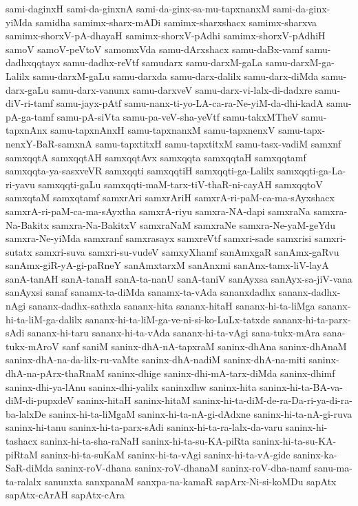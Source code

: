 {sami-daginxH
sami-da-ginxnA
sami-da-ginx-sa-mu-tapxnanxM
sami-da-ginx-yiMda
samidha
samimx-sharx-mADi
samimx-sharxshacx
samimx-sharxva
samimx-shorxV-pA-dhayaH
samimx-shorxV-pAdhi
samimx-shorxV-pAdhiH
samoV
samoV-peVtoV
samomxVda
samu-dArxshacx
samu-daBx-vamf
samu-dadhxqqtayx
samu-dadhx-reVtf
samudarx
samu-darxM-gaLa
samu-darxM-ga-Lalilx
samu-darxM-gaLu
samu-darxda
samu-darx-dalilx
samu-darx-diMda
samu-darx-gaLu
samu-darx-vanunx
samu-darxveV
samu-darx-vi-lalx-di-dadxre
samu-diV-ri-tamf
samu-jayx-pAtf
samu-nanx-ti-yo-LA-ca-ra-Ne-yiM-da-dhi-kadA
samu-pA-ga-tamf
samu-pA-siVta
samu-pa-veV-sha-yeVtf
samu-takxMTheV
samu-tapxnAnx
samu-tapxnAnxH
samu-tapxnanxM
samu-tapxnenxV
samu-tapx-nenxY-BaR-samxnA
samu-tapxtitxH
samu-tapxtitxM
samu-tasx-vadiM
samxnf
samxqqtA
samxqqtAH
samxqqtAvx
samxqqta
samxqqtaH
samxqqtamf
samxqqta-ya-sasxveVR
samxqqti
samxqqtiH
samxqqti-ga-Lalilx
samxqqti-ga-La-ri-yavu
samxqqti-gaLu
samxqqti-maM-tarx-tiV-thaR-ni-cayAH
samxqqtoV
samxqtaM
samxqtamf
samxrAri
samxrAriH
samxrA-ri-paM-ca-ma-sAyxshacx
samxrA-ri-paM-ca-ma-sAyxtha
samxrA-riyu
samxra-NA-dapi
samxraNa
samxra-Na-Bakitx
samxra-Na-BakitxV
samxraNaM
samxraNe
samxra-Ne-yaM-geYdu
samxra-Ne-yiMda
samxranf
samxrasayx
samxreVtf
samxri-sade
samxrisi
samxri-sutatx
samxri-suva
samxri-su-vudeV
samxyXhamf
sanAmxgaR
sanAmx-gaRvu
sanAmx-giR-yA-gi-paRneY
sanAmxtarxM
sanAnxmi
sanAnx-tamx-liV-layA
sanA-tanAH
sanA-tanaH
sanA-ta-nanU
sanA-taniV
sanAyxsa
sanAyx-sa-jiV-vana
sanAyxsi
sanaf
sanamx-ta-diMda
sanamx-ta-vAda
sananxdadhx
sananx-dadhx-nAgi
sananx-dadhx-sathxla
sananx-hita
sananx-hitaH
sananx-hi-ta-liMga
sananx-hi-ta-liM-ga-dalilx
sananx-hi-ta-liM-ga-ve-ni-si-ko-LuLx-tatxde
sananx-hi-ta-parx-sAdi
sananx-hi-taru
sananx-hi-ta-vAda
sananx-hi-ta-vAgi
sana-tukx-mAra
sana-tukx-mAroV
sanf
saniM
saninx-dhA-nA-tapxraM
saninx-dhAna
saninx-dhAnaM
saninx-dhA-na-da-lilx-ru-vaMte
saninx-dhA-nadiM
saninx-dhA-na-miti
saninx-dhA-na-pArx-thaRnaM
saninx-dhige
saninx-dhi-mA-tarx-diMda
saninx-dhimf
saninx-dhi-ya-lAnu
saninx-dhi-yalilx
saninxdhw
saninx-hita
saninx-hi-ta-BA-va-diM-di-pupxdeV
saninx-hitaH
saninx-hitaM
saninx-hi-ta-diM-de-ra-Da-ri-ya-di-ra-ba-lalxDe
saninx-hi-ta-liMgaM
saninx-hi-ta-nA-gi-dAdxne
saninx-hi-ta-nA-gi-ruva
saninx-hi-tanu
saninx-hi-ta-parx-sAdi
saninx-hi-ta-ra-lalx-da-varu
saninx-hi-tashacx
saninx-hi-ta-sha-raNaH
saninx-hi-ta-su-KA-piRta
saninx-hi-ta-su-KA-piRtaM
saninx-hi-ta-suKaM
saninx-hi-ta-vAgi
saninx-hi-ta-vA-gide
saninx-ka-SaR-diMda
saninx-roV-dhana
saninx-roV-dhanaM
saninx-roV-dha-namf
sanu-ma-ta-ralalx
sanunxta
sanxpanaM
sanxpa-na-kamaR
sapArx-Ni-si-koMDu
sapAtx
sapAtx-cArAH
sapAtx-cAra
}

